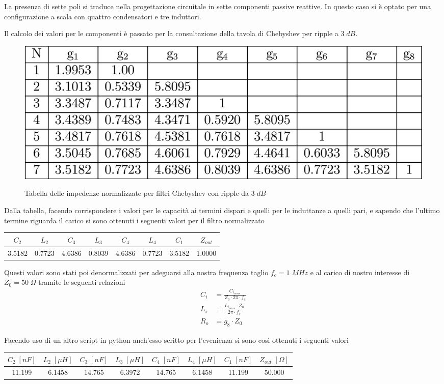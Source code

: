 \documentclass[a4paper,12pt]{report}
\begin{document}
La presenza di sette poli si traduce nella progettazione circuitale in sette componenti passive reattive. In questo caso si è optato per una configurazione a scala con quattro condensatori e tre induttori.

Il calcolo dei valori per le componenti è passato per la consultazione della tavola di Chebyshev per ripple a $3 \; dB$. 
\begin{figure}[!htb]
	\centering
	\includegraphics[width=.6\textwidth]{table.png}
	\label{loll}
	\caption{\label{kikw} \small Tabella delle impedenze normalizzate per filtri Chebyshev con ripple da $3 \; dB$}
\end{figure}

Dalla tabella, facendo corrispondere i valori per le capacità ai termini dispari e quelli per le induttanze a quelli pari, e sapendo che l'ultimo termine riguarda il carico si sono ottenuti i seguenti valori per il filtro normalizzato
\begin{center}
	\begin{tabular}{||c c c c c c c c ||} 
		\hline
		$C_2$  & $L_2$  & $C_3$  & $L_3$  & $C_4$  & $L_4$  & $C_1$  & $Z_{out}$\\ [0.5ex] 
		\hline\hline
		3.5182 & 0.7723 & 4.6386 & 0.8039 & 4.6386 & 0.7723 & 3.5182 & 1.0000\\ 
		\hline
	\end{tabular}
\end{center}


Questi valori sono stati poi denormalizzati per adeguarsi alla nostra frequenza taglio $f_c = 1 \; MHz$ e al carico di nostro interesse di $Z_0 = 50 \; \Omega$ tramite le seguenti relazioni
\begin{align}
C_i &= \frac{C_{i_{norm}}}{Z_0 \cdot 2\pi \cdot f_c}\\
L_i &= \frac{L_{i_{norm}}\cdot Z_0}{2\pi \cdot f_c}\\
R_o &= g_8 \cdot Z_0
\end{align}

Facendo uso di un altro script in python anch'esso scritto per l'evenienza si sono così ottenuti i seguenti valori
\begin{center}
		\begin{tabular}{||c c c c c c c c||} 
		\hline
		$C_2 \;[nF]$  & $L_2 \;[\mu H]$  & $C_3 \;[nF]$  & $L_3 \;[\mu H]$  &$C_4 \;[nF]$  & $L_4 \;[\mu H]$  & $C_1 \;[nF]$  & $Z_{out} 	\;[\Omega]$\\ [0.5ex] 
		\hline\hline
		11.199 & 6.1458 & 14.765 & 6.3972 & 14.765 & 6.1458 & 11.199 & 50.000\\ 
		\hline
	\end{tabular}
\end{center}
\newpage
\end{document}
